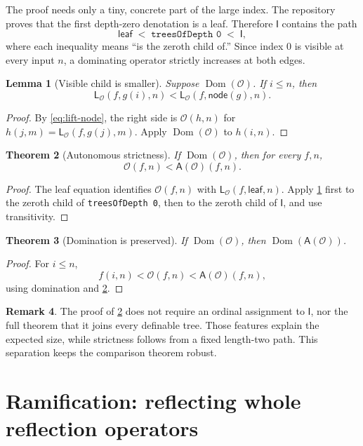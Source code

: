 \documentclass[11pt,oneside]{article}
\newtheorem{theorem}{Theorem}[section]
\newtheorem{lemma}[theorem]{Lemma}
\theoremstyle{definition}
\newtheorem{remark}[theorem]{Remark}
\newcommand{\Op}{\mathcal O}
\newcommand{\Index}{\mathsf I}
\newcommand{\Leaf}{\mathsf{leaf}}
\newcommand{\Node}{\mathsf{node}}
\newcommand{\Lift}{\mathsf L}
\newcommand{\Auto}{\mathsf A}
\newcommand{\code}[1]{\texttt{#1}}
\begin{document}
The proof needs only a tiny, concrete part of the large index.  The repository
proves that the first depth-zero denotation is a leaf.  Therefore $\Index$
contains the path
\[
 \Leaf
 \;<\;
 \code{treesOfDepth 0}
 \;<\;
 \Index,
\]
where each inequality means ``is the zeroth child of.''  Since index $0$ is
visible at every input $n$, a dominating operator strictly increases at both
edges.

\begin{lemma}[Visible child is smaller]\label{lem:child}
Suppose $\operatorname{Dom}(\Op)$.  If $i\le n$, then
\[
 \Lift_{\Op}(f,g(i),n)
 <
 \Lift_{\Op}(f,\Node(g),n).
\]
\end{lemma}
\begin{proof}
By \cref{eq:lift-node}, the right side is $\Op(h,n)$ for
$h(j,m)=\Lift_{\Op}(f,g(j),m)$.  Apply
$\operatorname{Dom}(\Op)$ to $h(i,n)$.
\end{proof}

\begin{theorem}[Autonomous strictness]\label{thm:op-auto}
If $\operatorname{Dom}(\Op)$, then for every $f,n$,
\[
 \Op(f,n)<\Auto(\Op)(f,n).
\]
\end{theorem}
\begin{proof}
The leaf equation identifies $\Op(f,n)$ with
$\Lift_{\Op}(f,\Leaf,n)$.  Apply \cref{lem:child} first to the zeroth
child of \code{treesOfDepth 0}, then to the zeroth child of $\Index$, and use
transitivity.
\end{proof}

\begin{theorem}[Domination is preserved]\label{thm:auto-dom}
If $\operatorname{Dom}(\Op)$, then
$\operatorname{Dom}(\Auto(\Op))$.
\end{theorem}
\begin{proof}
For $i\le n$,
\[
 f(i,n)<\Op(f,n)<\Auto(\Op)(f,n),
\]
using domination and \cref{thm:op-auto}.
\end{proof}

\begin{remark}
The proof of \cref{thm:op-auto} does not require an ordinal assignment to
$\Index$, nor the full theorem that it joins every definable tree.  Those
features explain the expected size, while strictness follows from a fixed
length-two path.  This separation keeps the comparison theorem robust.
\end{remark}

\section{Ramification: reflecting whole reflection operators}
\end{document}
